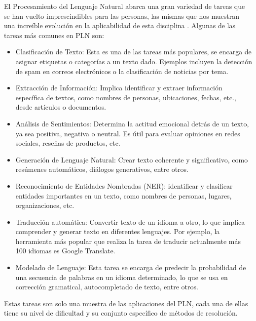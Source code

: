 El Procesamiento del Lenguaje Natural  abarca una gran variedad de tareas que se han vuelto imprescindibles para las personas, las mismas que  nos muestran una increíble evolución en la aplicabilidad de esta disciplina . Algunas de las tareas más comunes en PLN son:

\begin{itemize}

	\item Clasificación de Texto: Esta es una de las tareas más populares, se encarga de asignar etiquetas o categorías a un texto dado. Ejemplos incluyen la detección de spam en correos electrónicos o la clasificación de noticias por tema.

	\item Extracción de Información: Implica identificar y extraer información específica de textos, como nombres de personas, ubicaciones, fechas, etc., desde artículos o documentos.

	\item Análisis de Sentimientos: Determina la actitud emocional detrás de un texto, ya sea positiva, negativa o neutral. Es útil para evaluar opiniones en redes sociales, reseñas de productos, etc.

	\item Generación de Lenguaje Natural: Crear texto coherente y significativo, como resúmenes automáticos, diálogos generativos, entre otros.

	\item Reconocimiento de Entidades Nombradas (NER): identificar y clasificar entidades importantes en un texto, como nombres de personas, lugares, organizaciones, etc.

	\item Traducción automática: Convertir texto de un idioma a otro, lo que implica comprender y generar texto en diferentes lenguajes. Por ejemplo, la herramienta más popular que realiza la tarea de traducir actualmente más 100 idiomas es Google Translate.
	
	\item Modelado de Lenguaje: Esta tarea se encarga de  predecir la probabilidad de una secuencia de palabras en un idioma determinado, lo que se usa en corrección gramatical, autocompletado de texto, entre otros. 

\end{itemize}

Estas tareas son solo una muestra de las aplicaciones del PLN, cada una de ellas tiene su nivel de dificultad y su conjunto específico de métodos de resolución.

